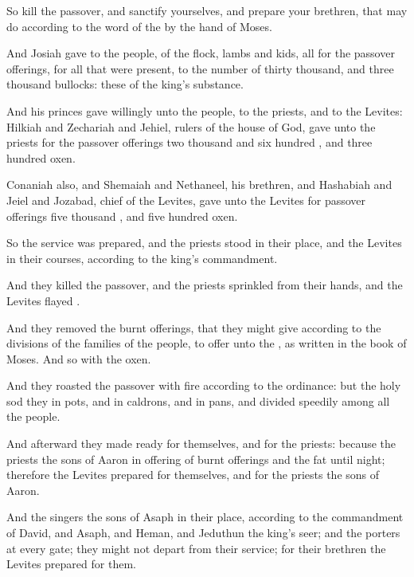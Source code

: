 {So
kill the
passover, and
sanctify yourselves, and
prepare your
brethren, that
{} may
do according to the
word of the
{} by the
hand of
Moses.

And
Josiah
gave to the
people, of the
flock,
lambs and
kids, all for the passover
offerings, for all that were
present, to the
number of
thirty
thousand, and
three
thousand
bullocks: these
{} of the
king’s
substance.

And his
princes
gave
willingly unto the
people, to the
priests, and to the
Levites:
Hilkiah and
Zechariah and
Jehiel,
rulers of the
house of
God,
gave unto the
priests for the passover
offerings two
thousand and
six
hundred
{}, and
three
hundred
oxen.

Conaniah also, and
Shemaiah and
Nethaneel, his
brethren, and
Hashabiah and
Jeiel and
Jozabad,
chief of the
Levites,
gave unto the
Levites for passover
offerings
five
thousand
{}, and
five
hundred
oxen.

So the
service was
prepared, and the
priests
stood in their
place, and the
Levites in their
courses, according to the
king’s
commandment.

And they
killed the
passover, and the
priests
sprinkled
{} from their
hands, and the
Levites
flayed
{}.

And they
removed the burnt
offerings, that they might
give according to the
divisions of the
families of the
people, to
offer unto the
{}, as
{}
written in the
book of
Moses. And so
{} with the
oxen.

And they
roasted the
passover with
fire according to the
ordinance: but the
{}
holy
{}
sod they in
pots, and in
caldrons, and in
pans, and divided
{}
speedily among all the
people.

And
afterward they made
ready for themselves, and for the
priests: because the
priests the
sons of
Aaron
{} in
offering of burnt
offerings and the
fat until
night; therefore the
Levites
prepared for themselves, and for the
priests the
sons of
Aaron.

And the
singers the
sons of
Asaph
{} in their
place, according to the
commandment of
David, and
Asaph, and
Heman, and
Jeduthun the
king’s
seer; and the
porters
{} at every
gate; they might not
depart from their
service; for their
brethren the
Levites
prepared for them.

}
